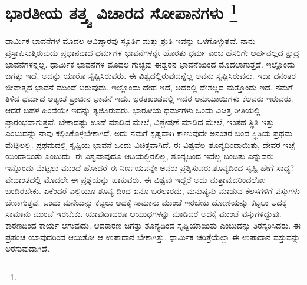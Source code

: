 
\chapter[ಭಾರತೀಯ ತತ್ತ್ವ ವಿಚಾರದ ಸೋಪಾನಗಳು ]{ಭಾರತೀಯ ತತ್ತ್ವ ವಿಚಾರದ ಸೋಪಾನಗಳು \protect\footnote{}}

ಧಾರ್ಮಿಕ ಭಾವನೆಗಳ ಮೊದಲ ಆವಿಷ್ಕಾರವು ಸ್ಫೂರ್ತಿ ಮತ್ತು ಶ್ರುತಿ ಇವನ್ನು ಒಳಗೊಳ್ಳುತ್ತವೆ. ನಾನು ಪ್ರಸ್ತಾಪಿಸುತ್ತಿರುವುದು ಪ್ರಧಾನವಾದ ಧರ್ಮಗಳ ಭಾವನೆಗಳನ್ನೇ ಹೊರತು ಧರ್ಮ ಎಂಬ ಹೆಸರಿಗೇ ಅರ್ಹವಲ್ಲದ ಕ್ಷುದ್ರ ಭಾವನೆಗಳನ್ನಲ್ಲ. ಧಾರ್ಮಿಕ ಭಾವನೆಗಳ ಮೊದಲ ಗುಚ್ಛವು ಈಶ್ವರನ ಭಾವನೆಯಿಂದ ಮೊದಲಾಗುತ್ತದೆ. ಇಲ್ಲೊಂದು ಜಗತ್ತು ಇದೆ. ಅದನ್ನು ಯಾರೊ ಸೃಷ್ಟಿಸಿರುವರು. ಈ ವಿಶ್ವದಲ್ಲಿರುವುದನ್ನೆಲ್ಲ ಅವನು ಸೃಷ್ಟಿಸಿರುವನು. ಇದಾ ದನಂತರ ಜೀವಾತ್ಮದ ಭಾವನೆ ಮುಂದೆ ಬರುವುದು. ಇಲ್ಲೊಂದು ದೇಹ ಇದೆ, ಅದರಲ್ಲಿ ದೇಶಲ್ಲದ ಮತ್ತೊಂದು ಇದೆ. ನಮಗೆ ತಿಳಿದ ಧರ್ಮದ ಅತ್ಯಂತ ಪ್ರಾಚೀನ ಭಾವನೆ ಇದು. ಭರತಖಂಡದಲ್ಲಿ ಇದರ ಅನುಯಾಯಿಗಳು ಕೆಲವರು ಇರುವರು. ಆದರೆ ಬಹಳ ಹಿಂದೆಯೇ ಇದನ್ನು ತ್ಯಜಿಸಿರುವರು. ಭಾರತೀಯ ಧರ್ಮಗಳು ಒಂದು ವಿಚಿತ್ರ ರೀತಿಯಲ್ಲಿ ಪ್ರಾರಂಭವಾಗುತ್ತವೆ. ಬೇಕಾದಷ್ಟು ಊಹೆ ಮಾಡಿದ ಮೇಲೆ, ವಿಶ್ಲೇಷಣೆ ಮಾಡಿದ ಮೇಲೆ, ಇಂತಹ ಸ್ಥಿತಿ ಇತ್ತು ಎಂಬುದನ್ನು ನಾವು ಕಲ್ಪಿಸಿಕೊಳ್ಳಬೇಕಾಗಿದೆ. ಅದು ನಮಗೆ ಸ್ಪಷ್ಟವಾಗಿ ಕಾಣುವುದೇ ಅನಂತರ ಬಂದ ಸ್ಥಿತಿಯ ಪ್ರಥಮ ಮೆಟ್ಟಿಲಲ್ಲಿ. ಪ್ರಥಮದಲ್ಲಿ ಸೃಷ್ಟಿಯ ಭಾವನೆ ಒಂದು ವಿಚಿತ್ರವಾಗಿದೆ. ಈ ವಿಶ್ವವೆಲ್ಲ ಶೂನ್ಯದಿಂದಾಯಿತು, ದೇವರ ಇಚ್ಛೆ ಯಿಂದಾಯಿತು ಎಂಬುದು. ಈ ವಿಶ್ವವಾವುದೂ ಆದಿಯಲ್ಲಿರಲಿಲ್ಲ, ಶೂನ್ಯದಿಂದ ಇದೆಲ್ಲ ಬಂದಿತು ಎನ್ನುವರು. ಇನ್ನೊಂದು ಮೆಟ್ಟಿಲು ಮುಂದೆ ಹೋದರೆ ಈ ನಿರ್ಣಯವನ್ನೇ ಅವರು ಪ್ರಶ್ನಿಸುವರು.ಶೂನ್ಯದಿಂದ ಸೃಷ್ಟಿ ಹೇಗೆ ಸಾಧ್ಯ? ವೇದಾಂತದಲ್ಲಿ ಮೊದಲೇ ಈ ಪ್ರಶ್ನೆಯನ್ನು ಹಾಕುವರು. ಈ ವಿಶ್ವವು ಇದ್ದರೆ ಅದು ಮತ್ತಾವುದರಿಂದಲೋ ಬಂದಿರಬೇಕು. ಏಕೆಂದರೆ ಎಲ್ಲಿಯೂ ಶೂನ್ಯ ದಿಂದ ಏನೂ ಬರಲಾರದು, ಮನುಷ್ಯನು ಮಾಡುವ ಕೆಲಸಗಳಿಗೆ ವಸ್ತುಗಳು ಬೇಕಾಗುತ್ತವೆ. ಒಂದು ಮನೆಯನ್ನು ಕಟ್ಟಲು ಅದಕ್ಕೆ ಸಾಮಾನು ಮುಂಚೆ ಇರಬೇಕು ದೋಣಿಯನ್ನು ಕಟ್ಟಲು ಅದಕ್ಕೆ ಸಾಮಾನು ಮುಂಚೆ ಇರಬೇಕು. ಯಾವುದಾದರೂ ಆಯುಧಗಳನ್ನು ಮಾಡಿದರೆ ಅದಕ್ಕೆ ಮುಂಚೆ ವಸ್ತುಗಳಿದ್ದುವು. ಕಾರಣದಿಂದ ಕಾರ್ಯ ಆಗುವುದು. ಆದಕಾರಣ ಜಗತ್ತು ಶೂನ್ಯದಿಂದ ಸೃಷ್ಟಿಯಾಯಿತು ಎಂಬುದನ್ನು ತಿರಸ್ಕರಿಸಿದರು. ಈ ಪ್ರಪಂಚ ಯಾವುದರಿಂದ ಆಯಿತೋ ಆ ಉಪಾದಾನ ಬೇಕಾಗಿತ್ತು. ಧಾರ್ಮಿಕ ಚರಿತ್ರೆಯೆಲ್ಲಾ ಈ ಉಪಾದಾನ ವಸ್ತುವನ್ನು ಅರಸುವುದಾಗಿದೆ.

